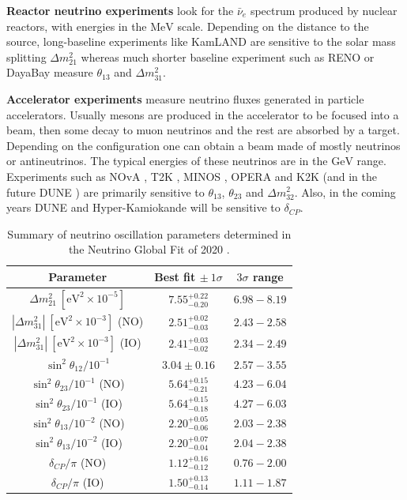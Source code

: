 \textbf{Reactor neutrino experiments} look for the $\bar{\nu}_{e}$ spectrum produced by nuclear reactors, with energies in the $\mathrm{MeV}$ scale. Depending on the distance to the source, long-baseline experiments like KamLAND \cite{KamLAND2013} are sensitive to the solar mass splitting $\Delta m^{2}_{21}$ whereas much shorter baseline experiment such as RENO \cite{RENO2018} or DayaBay \cite{DayaBay2018} measure $\theta_{13}$ and $\Delta m^{2}_{31}$.

\textbf{Accelerator experiments} measure neutrino fluxes generated in particle accelerators. Usually mesons are produced in the accelerator to be focused into a beam, then some decay to muon neutrinos and the rest are absorbed by a target. Depending on the configuration one can obtain a beam made of mostly neutrinos or antineutrinos. The typical energies of these neutrinos are in the $\mathrm{GeV}$ range. Experiments such as NOvA \cite{Nova2020}, T2K \cite{T2K2020}, MINOS \cite{MINOS2014}, OPERA \cite{OPERA2018} and K2K \cite{K2K2006} (and in the future DUNE \cite{DUNE2020}) are primarily sensitive to $\theta_{13}$, $\theta_{23}$ and $\Delta m^{2}_{32}$. Also, in the coming years  DUNE \cite{DUNE2020} and Hyper-Kamiokande \cite{Hyper-Kamiokande2019} will be sensitive to $\delta_{CP}$.

\begin{table}
\centering
\caption{Summary of neutrino oscillation parameters determined in the Neutrino Global Fit of 2020 \cite{deSalas2020}.}
	\begin{tabular}{c|c|c}
		Parameter                                               & Best fit $\pm ~ 1\sigma$ & $3 \sigma$ range   \\[1mm] \hline \rule{0pt}{1.1\normalbaselineskip}
		$\Delta m^{2}_{21}~[\mathrm{eV}^{2} \times 10^{-5}]$                   & $7.55^{+0.22}_{-0.20}$ & $6.98-8.19$\\[3mm]
		$\left|\Delta m^{2}_{31}\right|~[\mathrm{eV}^{2}\times 10^{-3}]$ (NO) & $2.51^{+0.02}_{-0.03}$    & $2.43-2.58$\\[2mm]
		$\left|\Delta m^{2}_{31}\right|~[\mathrm{eV}^{2}\times 10^{-3}]$ (IO) & $2.41^{+0.03}_{-0.02}$ & $2.34-2.49$    \\[3mm]
		$\sin^{2} \theta_{12} / 10^{-1}$ & $3.04 \pm 0.16$ & $2.57-3.55$ \\[3mm]
		$\sin^{2} \theta_{23} / 10^{-1}$ (NO) & $5.64^{+0.15}_{-0.21}$ & $4.23-6.04$ \\[2mm]
		$\sin^{2} \theta_{23} / 10^{-1}$ (IO) & $5.64^{+0.15}_{-0.18}$ & $4.27-6.03$ \\[3mm]
		$\sin^{2} \theta_{13} / 10^{-2}$ (NO) & $2.20^{+0.05}_{-0.06}$ & $2.03-2.38$ \\[2mm]
		$\sin^{2} \theta_{13} / 10^{-2}$ (IO) & $2.20^{+0.07}_{-0.04}$ & $2.04-2.38$ \\[3mm]
		$\delta_{CP} / \pi$ (NO) & $1.12^{+0.16}_{-0.12}$ & $0.76-2.00$ \\[2mm]
		$\delta_{CP} / \pi$ (IO) & $1.50^{+0.13}_{-0.14}$ & $1.11-1.87$
	\end{tabular}
	\label{tab:neutrino_global_fit}
\end{table}

